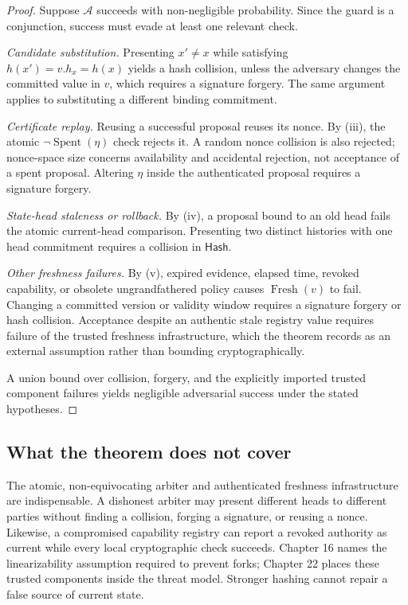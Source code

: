 \documentclass[11pt,openany]{book}
\newcommand{\Hash}{\mathsf{Hash}}
\begin{document}
\begin{proof}
Suppose \(\mathcal A\) succeeds with non-negligible probability. Since the
guard is a conjunction, success must evade at least one relevant check.

\textit{Candidate substitution.} Presenting \(x'\neq x\) while satisfying
\(h(x')=v.h_x=h(x)\) yields a hash collision, unless the adversary changes the
committed value in \(v\), which requires a signature forgery. The same argument
applies to substituting a different binding commitment.

\textit{Certificate replay.} Reusing a successful proposal reuses its nonce.
By (iii), the atomic \(\neg\operatorname{Spent}(\eta)\) check rejects it. A
random nonce collision is also rejected; nonce-space size concerns availability
and accidental rejection, not acceptance of a spent proposal. Altering \(\eta\)
inside the authenticated proposal requires a signature forgery.

\textit{State-head staleness or rollback.} By (iv), a proposal bound to an old
head fails the atomic current-head comparison. Presenting two distinct
histories with one head commitment requires a collision in \(\Hash\).

\textit{Other freshness failures.} By (v), expired evidence, elapsed time,
revoked capability, or obsolete ungrandfathered policy causes
\(\operatorname{Fresh}(v)\) to fail. Changing a committed version or validity
window requires a signature forgery or hash collision. Acceptance despite an
authentic stale registry value requires failure of the trusted freshness
infrastructure, which the theorem records as an external assumption rather
than bounding cryptographically.

A union bound over collision, forgery, and the explicitly imported trusted
component failures yields negligible adversarial success under the stated
hypotheses.
\end{proof}

\subsection{What the theorem does not cover}

The atomic, non-equivocating arbiter and authenticated freshness infrastructure
are indispensable. A dishonest arbiter may present different heads to
different parties without finding a collision, forging a signature, or
reusing a nonce. Likewise, a compromised capability registry can report a
revoked authority as current while every local cryptographic check succeeds.
Chapter 16 names the linearizability assumption required to prevent forks;
Chapter 22 places these trusted components inside the threat model. Stronger
hashing cannot repair a false source of current state.
\end{document}
